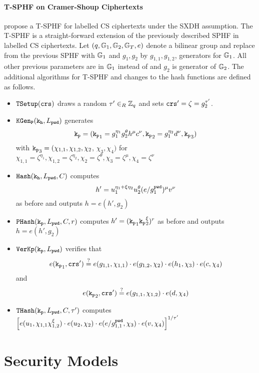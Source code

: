 \paragraph{\ac{T-SPHF} on Cramer-Shoup Ciphertexts}
\citet{Benhamouda2013} propose a \ac{T-SPHF} for labelled \ac{CS} ciphertexts under the \ac{SXDH} assumption.
The \ac{T-SPHF} is a straight-forward extension of the previously described \ac{SPHF} in labelled \ac{CS} ciphertexts.
Let $(q, \mathbb{G}_1, \mathbb{G}_2, \mathbb{G}_T, e)$ denote a bilinear group and replace \GG from the previous \ac{SPHF} with $\mathbb{G}_1$ and $g_1,g_2$ by $g_{1,1},g_{1,2}$, generators for $\mathbb{G}_1$.
All other previous parameters are in $\mathbb{G}_1$ instead of \GG and $g_2$ is generator of $\mathbb{G}_2$.
The additional algorithms for \ac{T-SPHF} and changes to the hash functions are defined as follows.
\begin{itemize}
  \item $\mathtt{TSetup}(\mathtt{crs})$ draws a random $\tau'\in_R\mathbb{Z}_q$ and sets $\mathtt{crs}'=\zeta=g_2^{\tau'}$.
  \item $\mathtt{KGen_P}(\mathtt{k_h}, L_\mathtt{pwd})$ generates 
      \[\mathtt{k_p}=(\mathtt{k_p}_1=g_1^{\eta_1} g_2^{\theta} h^\mu c^\nu, \mathtt{k_p}_2=g_1^{\eta_2} d^{\nu}, \mathtt{k_p}_3)\] with 
      $\mathtt{k_p}_3=(\chi_{1,1}, \chi_{1,2}, \chi_2$, $\chi_3, \chi_4)$ for 
      $\chi_{1,1}={\zeta}^{\eta_1}, \chi_{1,2}={\zeta}^{\eta_2}, \chi_2={\zeta}^{\theta}, \chi_3={\zeta}^{\mu}, \chi_4={\zeta}^{\nu}$
  \item $\mathtt{Hash}(\mathtt{k_h}, L_\mathtt{pwd}, C)$ computes 
      \[h'=u_1^{\eta_1+\xi\eta_2} u_2^{\theta} (e/g_1^{\mathtt{pwd}})^\mu v^\nu\] 
      as before and outputs $h=e(h',g_2)$
  \item $\mathtt{PHash}(\mathtt{k_p}, L_\mathtt{pwd}, C, r)$ computes $h'=(\mathtt{k_p}_1 \mathtt{k_p}_2^\xi)^r$ as before and outputs $h=e(h',g_2)$
  \item $\mathtt{VerKp}(\mathtt{k_p}, L_\mathtt{pwd})$ verifies that 
      \[e(\mathtt{k_p}_1, \mathtt{crs}')\stackrel{?}{=} e(g_{1,1}, \chi_{1,1})\cdot e(g_{1,2}, \chi_2)\cdot e(h_1, \chi_3)\cdot e(c, \chi_4)\] and
      \[e(\mathtt{k_p}_2, \mathtt{crs}') \stackrel{?}{=} e(g_{1,1}, \chi_{1,2})\cdot e(d, \chi_4)\]
  \item $\mathtt{THash}(\mathtt{k_p}, L_\mathtt{pwd}, C, \tau')$ computes $\left[ e(u_1, \chi_{1,1} \chi_{1,2}^{\xi})\cdot e(u_2, \chi_2)\cdot e(e/g_{1,1}^{\mathtt{pwd}}, \chi_3)\cdot e(v, \chi_4) \right]^{1/\tau'}$
\end{itemize}


\section{Security Models}



